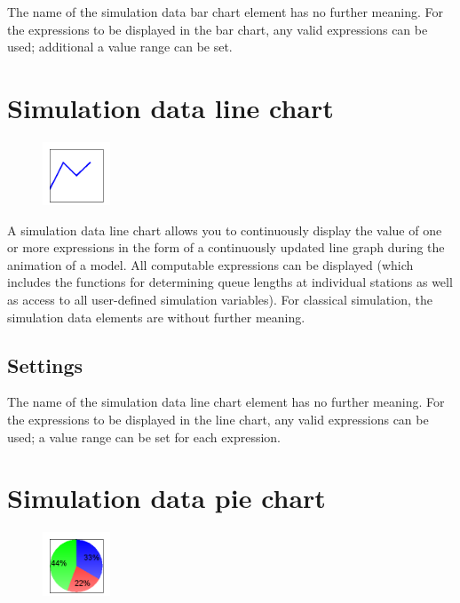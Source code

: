 The name of the simulation data bar chart element has no further meaning.
For the expressions to be displayed in the bar chart, any valid expressions can be used;
additional a value range can be set.


\section{Simulation data line chart}
\label{ref:ModelElementAnimationDiagram}

\begin{figure}
\vspace{-22pt}
\includegraphics[width=2cm]{imageModelElementAnimationDiagram.png}
\vspace{-22pt}
\end{figure}

A simulation data line chart allows you to continuously display the value of one or more expressions
in the form of a continuously updated line graph during the animation of a model.
All computable expressions can be displayed (which includes the functions for determining queue
lengths at individual stations as well as access to all user-defined simulation variables).
For classical simulation, the simulation data elements are without further meaning.

\subsection*{Settings}

The name of the simulation data line chart element has no further meaning.
For the expressions to be displayed in the line chart, any valid expressions can be used;
a value range can be set for each expression.


\section{Simulation data pie chart}
\label{ref:ModelElementAnimationPieChart}

\begin{figure}
\vspace{-22pt}
\includegraphics[width=2cm]{imageModelElementAnimationPieChart.png}
\vspace{-22pt}
\end{figure}

